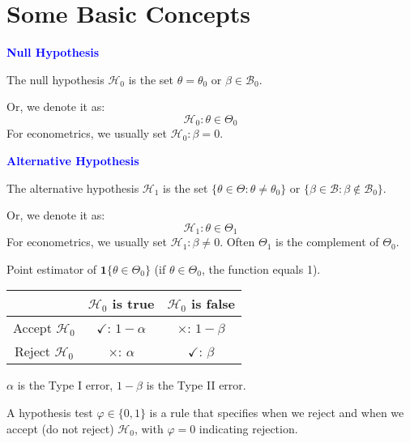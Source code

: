 \section{Some Basic Concepts}

\begin{definition}
    \textbf{\textcolor{blue}{Null Hypothesis}}
    
    The null hypothesis $\mathcal{H}_0$ is the set $\theta = \theta_0$ or $\beta \in \mathcal{B}_0$.
    
    Or, we denote it as:
    \[ \mathcal{H}_0 : \theta \in \Theta_0 \]
    For econometrics, we usually set $\mathcal{H}_0 : \beta = 0$.
\end{definition}

\begin{definition}
    \textbf{\textcolor{blue}{Alternative Hypothesis}}
    
    The alternative hypothesis $\mathcal{H}_1$ is the set $\{ \theta \in \Theta : \theta \neq \theta_0 \}$ or $\{ \beta \in \mathcal{B} : \beta \notin \mathcal{B}_0 \}$.
    
    Or, we denote it as:
    \[ \mathcal{H}_1 : \theta \in \Theta_1 \]
    For econometrics, we usually set $\mathcal{H}_1 : \beta \neq 0$. Often $\Theta_1$ is the complement of $\Theta_0$.
\end{definition}

\begin{note}
    Point estimator of $\mathbf{1} \{ \theta \in \Theta_0 \}$ (if $\theta \in \Theta_0$, the function equals 1).
\end{note}

\begin{center}
    \begin{tabular}{|c|c|c|}
        \hline
        & $\mathcal{H}_0$ is true & $\mathcal{H}_0$ is false\\
        \hline
        Accept $\mathcal{H}_0$ & $\checkmark$: $1 - \alpha$ & $\times$: $1 - \beta$\\
        \hline
        Reject $\mathcal{H}_0$ & $\times$: $\alpha$ & $\checkmark$: $\beta$\\
        \hline
    \end{tabular}
\end{center}

$\alpha$ is the Type I error, $1 - \beta$ is the Type II error.

\begin{definition}
    A hypothesis test $\varphi \in \{0, 1\}$ is a rule that specifies when we reject and when we accept (do not reject) $\mathcal{H}_0$, with $\varphi = 0$ indicating rejection.
\end{definition}

